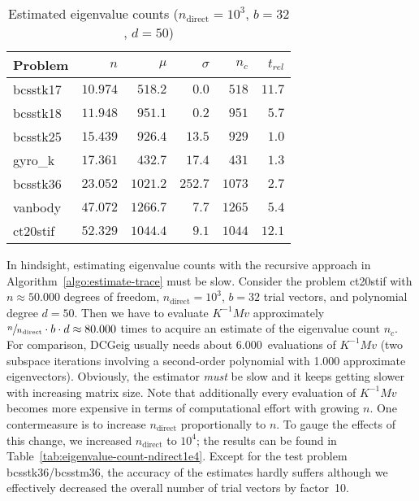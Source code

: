 \documentclass[%
	paper=a4,
	fontsize=10pt,
	DIV11,BCOR10mm,
	numbers=noenddot,
	abstract=yes
]{scrartcl}
\theoremstyle{definition}
\begin{document}
\begin{table}
	\begin{center}
		\begin{tabular}{lrrrrr}
			Problem & $n$ & $\mu$ & $\sigma$ & $n_c$ & $t_{rel}$ \\
			\toprule
			bcsstk17 & $10.974$ &  $518.2$ &   $0.0$ &  $518$ & $11.7$ \\
			bcsstk18 & $11.948$ &  $951.1$ &   $0.2$ &  $951$ &  $5.7$ \\
			bcsstk25 & $15.439$ &  $926.4$ &  $13.5$ &  $929$ &  $1.0$ \\
			gyro\_k  & $17.361$ &  $432.7$ &  $17.4$ &  $431$ &  $1.3$ \\
			bcsstk36 & $23.052$ & $1021.2$ & $252.7$ & $1073$ &  $2.7$ \\
			vanbody  & $47.072$ & $1266.7$ &   $7.7$ & $1265$ &  $5.4$ \\
			ct20stif & $52.329$ & $1044.4$ &   $9.1$ & $1044$ & $12.1$
		\end{tabular}%
	\end{center}%
	\caption{Estimated eigenvalue counts ($n_{\text{direct}} = 10^3$, $b = 32$,
	$d = 50$)}
	\label{tab:eigenvalue-count-ndirect1e3}
\end{table}

In hindsight, estimating eigenvalue counts with the recursive approach in
Algorithm~\ref{algo:estimate-trace} must be slow. Consider the problem ct20stif
with $n \approx 50.000$ degrees of freedom, $n_{\text{direct}} = 10^3$, $b = 32$
trial vectors, and polynomial degree $d = 50$. Then we have to evaluate $K^{-1}
M v$ approximately $\sfrac{n}{n_{\text{direct}}} \cdot b \cdot d \approx 80.000$
times to acquire an estimate of the eigenvalue count $n_c$. For comparison,
DCGeig usually needs about 6.000~evaluations of $K^{-1} M v$ (two subspace
iterations involving a second-order polynomial with 1.000 approximate
eigenvectors). Obviously, the estimator \emph{must} be slow and it keeps
getting slower with increasing matrix size. Note that additionally every
evaluation of $K^{-1} M v$ becomes more expensive in terms of computational
effort with growing $n$. One contermeasure is to increase $n_{\text{direct}}$
proportionally to $n$. To gauge the effects of this change, we increased
$n_{\text{direct}}$ to $10^4$; the results can be found in
Table~\ref{tab:eigenvalue-count-ndirect1e4}. Except for the test problem
bcsstk36/bcsstm36, the accuracy of the estimates hardly suffers although we
effectively decreased the overall number of trial vectors by factor~10.
\end{document}
